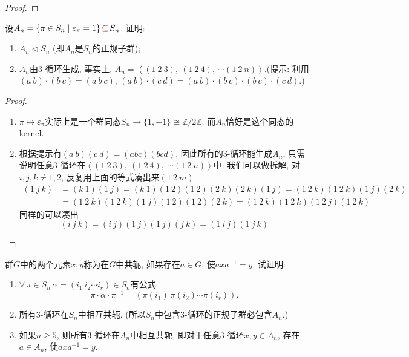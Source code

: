 \begin{proof}
    
\end{proof}

\begin{problem}
    设$A_n= \{\pi \in S_n \mid \varepsilon_\pi = 1\} \,\textcolor{red}{\subseteq}\, S_n$, 证明: 
    \begin{enumerate}[(1)]
        \item $A_n \lhd S_n$ (即$A_n$是$S_n$的正规子群);
        \item $A_n$由$3$-循环生成, 事实上, $A_n = \left\langle (1\:2\:3),\: (1\:2\:4),\: \cdots (1\:2\:n) \right\rangle$.(提示: 利用$(a\:b) \cdot (b\:c) = (a\:b\:c),\, (a\:b) \cdot (c\:d) = (a\:b) \cdot (b\:c) \cdot (b\:c) \cdot (c\:d)$.)
    \end{enumerate}
\end{problem}

\begin{proof}
    \begin{enumerate}[(1)]
        \item $\pi \mapsto \varepsilon_\pi$实际上是一个群同态$S_n \to \{1, -1\} \cong \mathbb{Z}/2\mathbb{Z}$. 而$A_n$恰好是这个同态的kernel.
        \item 根据提示有$(a\:b)(c\:d) = (abc)(bcd)$, 因此所有的$3$-循环能生成$A_n$, 只需说明任意$3$-循环在$\left\langle (1\:2\:3),\: (1\:2\:4),\: \cdots (1\:2\:n) \right\rangle$中. 我们可以做拆解, 对$i, j, k \neq 1, 2$, 反复用上面的等式凑出来$(1\:2\:m)$.
        \[
        \begin{aligned}
            (1\:j\:k) &= (k\:1)(1\:j) = (k\:1)(1\:2)(1\:2)(2\:k)(2\:k)(1\:j) = (1\:2\:k)(1\:2\:k)(1\:j)(2\:k)\\
            &= (1\:2\:k)(1\:2\:k)(1\:j)(1\:2)(1\:2)(2\:k) = (1\:2\:k)(1\:2\:k)(1\:2\:j)(1\:2\:k)
        \end{aligned}
        \]
        同样的可以凑出
        \[
            (i\:j\:k) = (i\:j)(1\:j)(1\:j)(j\:k) = (1\:i\:j)(1\:j\:k)
        \]
    \end{enumerate}
\end{proof}

\begin{problem}
    群$G$中的两个元素$x, y$称为在$G$中共轭, 如果存在$a \in G$, 使$axa^{-1} = y$. 试证明: 
    \begin{enumerate}[(1)]
        \item $\forall\, \pi \in S_n\, \alpha = (i_1\:i_2 \cdots i_r) \in S_n$有公式
        \[
            \pi \cdot \alpha \cdot \pi^{-1} = (\pi(i_1)\:\pi(i_2) \cdots \pi(i_r)).
        \]
        \item 所有$3$-循环在$S_n$中相互共轭. (所以$S_n$中包含$3$-循环的正规子群必包含$A_n$.)
        \item 如果$n \geqslant 5$, 则所有$3$-循环在$A_n$中相互共轭, 即对于任意$3$-循环$x,y \in A_n$, 存在$a \in A_n$, 使$axa^{-1} = y$.
    \end{enumerate}
\end{problem}

